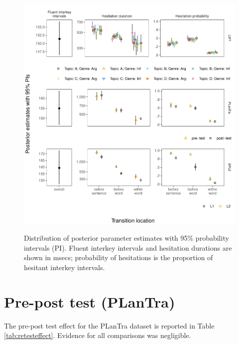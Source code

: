 \documentclass[
  man,floatsintext]{apa7}
\begin{document}
\begin{figure}[!htb]
\ContinuedFloat
\captionsetup{list=off,format=cont}
\centering
\includegraphics{figures/psplots2constr.pdf}
\label{fig:fullps1}
\caption{Distribution of posterior parameter estimates with 95\% probability intervals (PI). Fluent interkey intervals and hesitation durations are shown in msecs; probability of hesitations is the proportion of hesitant interkey intervals.}

\end{figure}

\newpage

\hypertarget{pre-post-test-plantra}{%
\section{Pre-post test (PLanTra)}\label{pre-post-test-plantra}}

The pre-post test effect for the PLanTra dataset is reported in Table \ref{tab:retesteffect}. Evidence for all comparisons was negligible.
\end{document}
